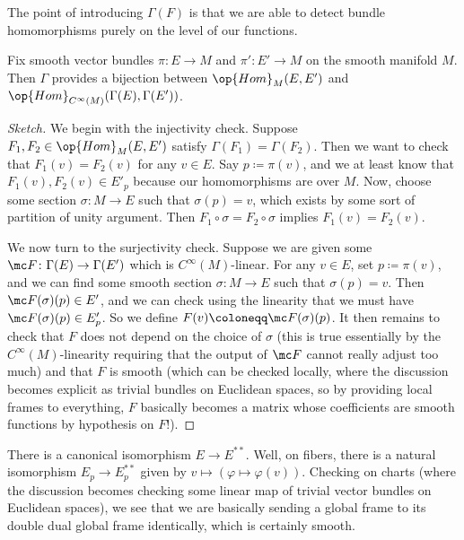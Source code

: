 \documentclass[../notes.tex]{subfiles}
\begin{document}
The point of introducing $\Gamma(F)$ is that we are able to detect bundle homomorphisms purely on the level of our functions.
\begin{lemma}
	Fix smooth vector bundles $\pi\colon E\to M$ and $\pi'\colon E'\to M$ on the smooth manifold $M$. Then $\Gamma$ provides a bijection between $\op{Hom}_M(E,E')$ and $\op{Hom}_{C^\infty(M)}(\Gamma(E),\Gamma(E'))$.
\end{lemma}
\begin{proof}[Sketch]
	We begin with the injectivity check. Suppose $F_1,F_2\in\op{Hom}_M(E,E')$ satisfy $\Gamma(F_1)=\Gamma(F_2)$. Then we want to check that $F_1(v)=F_2(v)$ for any $v\in E$. Say $p\coloneqq\pi(v)$, and we at least know that $F_1(v),F_2(v)\in E'_p$ because our homomorphisms are over $M$. Now, choose some section $\sigma\colon M\to E$ such that $\sigma(p)=v$, which exists by some sort of partition of unity argument. Then $F_1\circ\sigma=F_2\circ\sigma$ implies $F_1(v)=F_2(v)$.

	We now turn to the surjectivity check. Suppose we are given some $\mc F\colon\Gamma(E)\to\Gamma(E')$ which is $C^\infty(M)$-linear. For any $v\in E$, set $p\coloneqq\pi(v)$, and we can find some smooth section $\sigma\colon M\to E$ such that $\sigma(p)=v$. Then $\mc F(\sigma)(p)\in E'$, and we can check using the linearity that we must have $\mc F(\sigma)(p)\in E'_p$. So we define $F(v)\coloneqq\mc F(\sigma)(p)$. It then remains to check that $F$ does not depend on the choice of $\sigma$ (this is true essentially by the $C^\infty(M)$-linearity requiring that the output of $\mc F$ cannot really adjust too much) and that $F$ is smooth (which can be checked locally, where the discussion becomes explicit as trivial bundles on Euclidean spaces, so by providing local frames to everything, $F$ basically becomes a matrix whose coefficients are smooth functions by hypothesis on $F$!).
\end{proof}
\begin{example}
	There is a canonical isomorphism $E\to E^{**}$. Well, on fibers, there is a natural isomorphism $E_p\to E_p^{**}$ given by $v\mapsto(\varphi\mapsto\varphi(v))$. Checking on charts (where the discussion becomes checking some linear map of trivial vector bundles on Euclidean spaces), we see that we are basically sending a global frame to its double dual global frame identically, which is certainly smooth.
\end{example}
\end{document}
